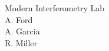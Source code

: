 \begin{titlepage}

\begin{center}

\Huge Modern Interferometry Lab \\[.5cm]

\large A. Ford \\ A. Garcia \\ R. Miller 

\date{\today}

\end{center}

\end{titlepage}